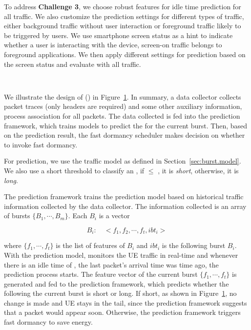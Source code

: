 To address {\bf Challenge 3}, we choose robust features for idle time prediction for all traffic. We also customize the prediction settings for different types of traffic, either background traffic without user interaction or foreground traffic likely to be triggered by users. We use smartphone screen status as a hint to indicate whether a user is interacting with the device, \ie screen-on traffic belongs to foreground applications. We then apply different settings for prediction based on the screen status and evaluate \NAME with all traffic.

\begin{figure}[t]
\centering
{} \\
\label{fig:flow}
\end{figure}

We illustrate the design of  \NAMEFULL (\NAME) in Figure~\ref{fig:flow}. In summary, a data collector collects packet traces (only headers are required) and some other auxiliary information, \eg process association for all packets. The data collected is fed into the \IBT prediction framework, which trains models to predict the \IBT for the current burst. Then, based on the prediction result, the fast dormancy scheduler makes decision on whether to invoke fast dormancy.

For \IBT prediction, we use the traffic model as defined in Section~\ref{sec:burst.model}. We also use a short \IBT threshold \SBT to classify an \IBT, \ie if \IBT $\leq$ \SBT, it is {\em short}, otherwise, it is {\em long}.

The \IBT prediction framework trains the prediction model based on historical traffic information collected by the data collector. The information collected is an array of bursts $\{B_{1}, \cdots, B_{m}\}$. Each $B_{i}$ is a vector

\begin{displaymath}
B_{i}:\quad <f_{1}, f_{2}, \cdots, f_{t}, ibt_{i}>
\end{displaymath}

where $\{f_{1}, \cdots, f_{t}\}$ is the list of features of $B_{i}$ and $ibt_{i}$ is the \IBT following burst $B_{i}$.
With the prediction model,  \NAME monitors the UE traffic in real-time and whenever there is an idle time of \BT, \ie the last packet's arrival time was \BT time ago, the prediction process starts. The feature vector of the current burst $\{f_{1}, \cdots, f_{t}\}$ is generated and fed to the prediction framework, which predicts whether the \IBT following the current burst is short or long. If short, as shown in Figure~\ref{fig:flow}, no change is made and UE stays in the tail, since the prediction framework suggests that a packet would appear soon. Otherwise, the prediction framework triggers fast dormancy to save energy.


